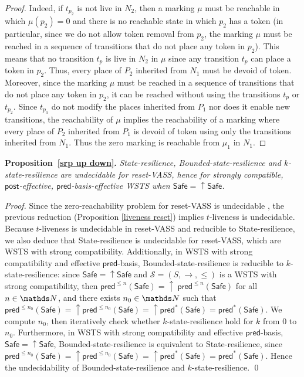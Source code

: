 \documentclass[runningheads]{llncs}
\newcommand{\mathieu}[1]{\todo[inline,color=blue!20]{{\bf MH:} #1}}
\newcommand{\pred}{\textsf{pred}}
\newcommand{\post}{\textsf{post}}
\newcommand{\Safe}{\textsf{Safe}}
\begin{document}
\begin{proof}
Indeed, if $t_{p_2}$ is not live in $N_2$, then a marking $\mu$ must be reachable in which $\mu(p_2) = 0$ and there is no reachable state in which $p_2$ has a token (in particular, since we do not allow token removal from $p_2$, the marking $\mu$ must be reached in a sequence of transitions that do not place any token in $p_2$).
This means that no transition $t_p$ is live in $N_2$ in $\mu$ since any transition $t_p$ can place a token in $p_2$. 
Thus, every place of $P_2$ inherited from $N_1$ must be devoid of token. Moreover, since the marking $\mu$ must be reached  in a sequence of transitions that do not place any token in $p_2$, 
it can be reached without using the transitions $t_p$ or $t_{p_2}$. Since $t_{p_a}$ do not modify the places inherited from $P_1$ nor does it enable new transitions, the reachability of $\mu$ implies the reachability of a marking where every place of $P_2$ inherited from $P_1$ is devoid of token using only the transitions inherited from $N_1$. Thus the zero marking is reachable from $\mu_1$ in $N_1$.
\end{proof}

\mathieu{mettre ici le détail de la  prop5}


\noindent
\textbf{Proposition~\ref{srp up down}.}
{\em {\sc State-resilience},
{\sc Bounded-state-resilience} and
{\sc $k$-state-resilience}
are undecidable for reset-VASS, hence for strongly compatible,
$\post$-effective, $\pred$-basis-effective WSTS
when
$\Safe=\mathop{\uparrow} \Safe$.
}


\begin{proof}
Since the zero-reachability problem for reset-VASS is undecidable \cite{dufourd1998reset}, the previous reduction (Proposition \ref{liveness reset}) implies 
{\sc $t$-liveness} is undecidable.
Because
{\sc $t$-liveness} is undecidable in reset-VASS
and reducible to {\sc State-resilience}, we also deduce that {\sc State-resilience} is undecidable for reset-VASS, which are WSTS with strong compatibility.
Additionally, in WSTS with strong compatibility and effective $\pred$-basis, {\sc Bounded-state-resilience} is
reducible to {\sc $k$-state-resilience}:
since $\Safe=\mathop{\uparrow} \Safe$ and
$\mathscr{S}=(S,\rightarrow,\leq)$ is a WSTS with strong 
compatibility, then $\pred^{\leq n}(\Safe)= \mathop{\uparrow}~\pred^{\leq n}(\Safe)$ for all $n \in \N$,
and there exists $n_0 \in \N$ such that 
$\pred^{\leq n_0}(\Safe) = \mathop{\uparrow} \pred^{\leq n_0}(\Safe) = \mathop{\uparrow} \pred^*(\Safe) = \pred^*(\Safe)$.
We compute 
$n_0$, then iteratively check whether $k$-state-resilience 
hold for $k$ from $0$ to $n_0$.  
Furthermore, in WSTS with strong compatibility and effective $\pred$-basis,  $\Safe=\mathop{\uparrow} \Safe$, {\sc Bounded-state-resilience} is equivalent to {\sc State-resilience},
since 
$\pred^{\leq n_0}(\Safe) = \mathop{\uparrow} \pred^{\leq n_0}(\Safe) = {\mathop{\uparrow} \pred^*(\Safe)} = \pred^*(\Safe)$.
Hence the undecidability of {\sc Bounded-state-resilience}
and 
 {\sc $k$-state-resilience}. \qed
\end{proof}
\end{document}
